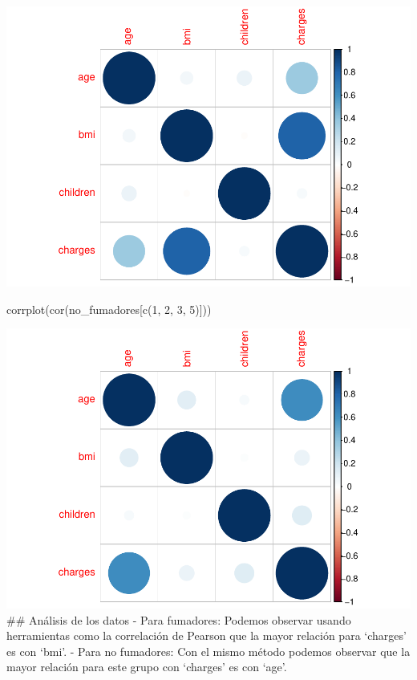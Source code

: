 \documentclass[]{article}
\newenvironment{Shaded}{\begin{snugshade}}{\end{snugshade}}
\newcommand{\DecValTok}[1]{\textcolor[rgb]{0.00,0.00,0.81}{#1}}
\newcommand{\FunctionTok}[1]{\textcolor[rgb]{0.00,0.00,0.00}{#1}}
\newcommand{\NormalTok}[1]{#1}
\begin{document}
\includegraphics{Enunciado_Tarea_3_files/figure-latex/unnamed-chunk-15-1.pdf}

\begin{Shaded}
\begin{Highlighting}[]
\FunctionTok{corrplot}\NormalTok{(}\FunctionTok{cor}\NormalTok{(no\_fumadores[}\FunctionTok{c}\NormalTok{(}\DecValTok{1}\NormalTok{, }\DecValTok{2}\NormalTok{, }\DecValTok{3}\NormalTok{, }\DecValTok{5}\NormalTok{)]))}
\end{Highlighting}
\end{Shaded}

\includegraphics{Enunciado_Tarea_3_files/figure-latex/unnamed-chunk-15-2.pdf}
\#\# Análisis de los datos - Para fumadores: Podemos observar usando
herramientas como la correlación de Pearson que la mayor relación para
`charges' es con `bmi'. - Para no fumadores: Con el mismo método podemos
observar que la mayor relación para este grupo con `charges' es con
`age'.
\end{document}
